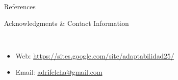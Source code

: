 \documentclass[final]{beamer}
\newlength{\onecolwid}
\begin{document}
\begin{frame}[t]
\begin{columns}[t]
\begin{column}{\onecolwid}
\begin{alertblock}{References}
\end{alertblock}



\begin{alertblock}{Acknowledgments \& Contact Information}

\small{} \\

\begin{itemize}
\item Web: \href{https://sites.google.com/site/adaptabilidad25/}{https://sites.google.com/site/adaptabilidad25/}
\item Email: \href{mailto:adrifelcha@gmail.com}{adrifelcha@gmail.com}
\end{itemize}


\end{alertblock}
\end{column} %
\end{columns} %
\end{frame} %
\end{document}
